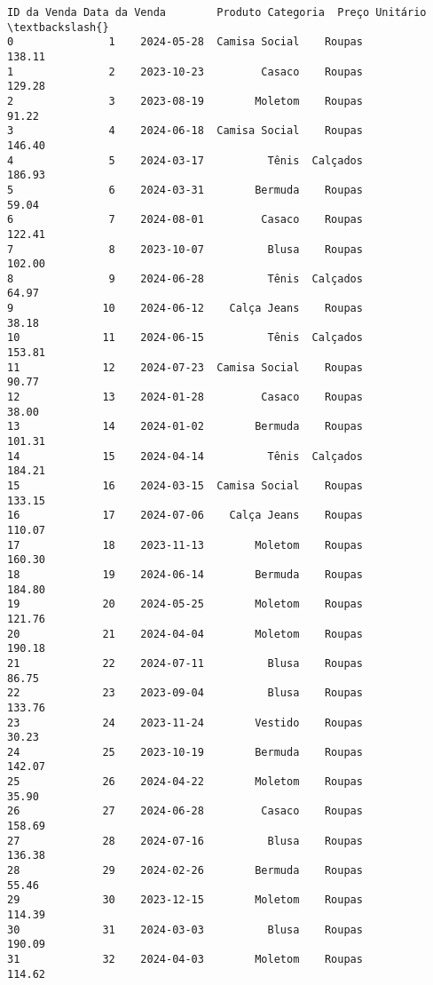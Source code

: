 \documentclass[11pt]{article}
\begin{document}
    
    \begin{Verbatim}[commandchars=\\\{\}]
      ID da Venda Data da Venda        Produto Categoria  Preço Unitário  \textbackslash{}
0               1    2024-05-28  Camisa Social    Roupas          138.11   
1               2    2023-10-23         Casaco    Roupas          129.28   
2               3    2023-08-19        Moletom    Roupas           91.22   
3               4    2024-06-18  Camisa Social    Roupas          146.40   
4               5    2024-03-17          Tênis  Calçados          186.93   
5               6    2024-03-31        Bermuda    Roupas           59.04   
6               7    2024-08-01         Casaco    Roupas          122.41   
7               8    2023-10-07          Blusa    Roupas          102.00   
8               9    2024-06-28          Tênis  Calçados           64.97   
9              10    2024-06-12    Calça Jeans    Roupas           38.18   
10             11    2024-06-15          Tênis  Calçados          153.81   
11             12    2024-07-23  Camisa Social    Roupas           90.77   
12             13    2024-01-28         Casaco    Roupas           38.00   
13             14    2024-01-02        Bermuda    Roupas          101.31   
14             15    2024-04-14          Tênis  Calçados          184.21   
15             16    2024-03-15  Camisa Social    Roupas          133.15   
16             17    2024-07-06    Calça Jeans    Roupas          110.07   
17             18    2023-11-13        Moletom    Roupas          160.30   
18             19    2024-06-14        Bermuda    Roupas          184.80   
19             20    2024-05-25        Moletom    Roupas          121.76   
20             21    2024-04-04        Moletom    Roupas          190.18   
21             22    2024-07-11          Blusa    Roupas           86.75   
22             23    2023-09-04          Blusa    Roupas          133.76   
23             24    2023-11-24        Vestido    Roupas           30.23   
24             25    2023-10-19        Bermuda    Roupas          142.07   
25             26    2024-04-22        Moletom    Roupas           35.90   
26             27    2024-06-28         Casaco    Roupas          158.69   
27             28    2024-07-16          Blusa    Roupas          136.38   
28             29    2024-02-26        Bermuda    Roupas           55.46   
29             30    2023-12-15        Moletom    Roupas          114.39   
30             31    2024-03-03          Blusa    Roupas          190.09   
31             32    2024-04-03        Moletom    Roupas          114.62   

\end{Verbatim}
\end{document}
